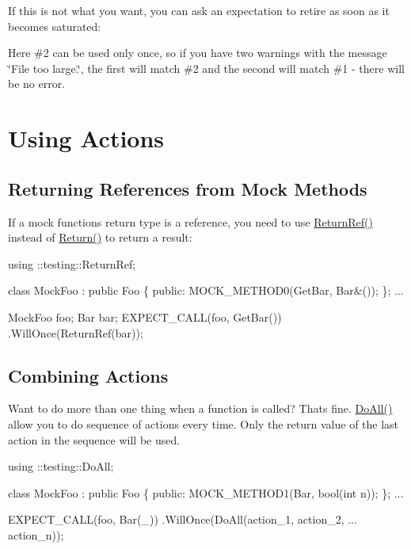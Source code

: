If this is not what you want, you can ask an expectation to retire as soon as it becomes saturated\+:




Here \#2 can be used only once, so if you have two warnings with the message {\ttfamily \char`\"{}\+File too large.\char`\"{}}, the first will match \#2 and the second will match \#1 -\/ there will be no error.

\section*{Using Actions}

\subsection*{Returning References from Mock Methods}

If a mock function\textquotesingle{}s return type is a reference, you need to use {\ttfamily \hyperlink{namespacetesting_a18eda8fe9c89ee856c199a2e04ca1641}{Return\+Ref()}} instead of {\ttfamily \hyperlink{namespacetesting_af6d1c13e9376c77671e37545cd84359c}{Return()}} to return a result\+:


\begin{DoxyCode}
using ::testing::ReturnRef;

class MockFoo : public Foo \{
 public:
  MOCK\_METHOD0(GetBar, Bar&());
\};
...

  MockFoo foo;
  Bar bar;
  EXPECT\_CALL(foo, GetBar())
      .WillOnce(ReturnRef(bar));
\end{DoxyCode}


\subsection*{Combining Actions}

Want to do more than one thing when a function is called? That\textquotesingle{}s fine. {\ttfamily \hyperlink{namespacetesting_a5f533932753d2af95000e96c4a3042e3}{Do\+All()}} allow you to do sequence of actions every time. Only the return value of the last action in the sequence will be used.


\begin{DoxyCode}
using ::testing::DoAll;

class MockFoo : public Foo \{
 public:
  MOCK\_METHOD1(Bar, bool(int n));
\};
...

  EXPECT\_CALL(foo, Bar(\_))
      .WillOnce(DoAll(action\_1,
                      action\_2,
                      ...
                      action\_n));
\end{DoxyCode}


